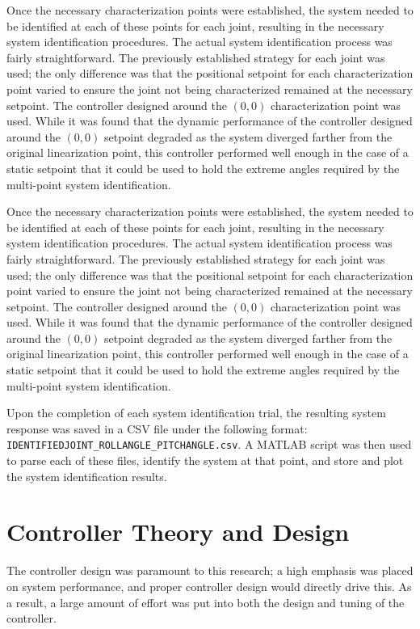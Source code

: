 Once the necessary characterization points were established, the system needed to be identified at each of these points for each joint, resulting in the necessary system identification procedures. The actual system identification process was fairly straightforward. The previously established strategy for each joint was used; the only difference was that the positional setpoint for each characterization point varied to ensure the joint not being characterized remained at the necessary setpoint. The controller designed around the $(0,0)$ characterization point was used. While it was found that the dynamic performance of the controller designed around the $(0,0)$ setpoint degraded as the system diverged farther from the original linearization point, this controller performed well enough in the case of a static setpoint that it could be used to hold the extreme angles required by the multi-point system identification.

Once the necessary characterization points were established, the system needed to be identified at each of these points for each joint, resulting in the necessary system identification procedures. The actual system identification process was fairly straightforward. The previously established strategy for each joint was used; the only difference was that the positional setpoint for each characterization point varied to ensure the joint not being characterized remained at the necessary setpoint. The controller designed around the $(0,0)$ characterization point was used. While it was found that the dynamic performance of the controller designed around the $(0,0)$ setpoint degraded as the system diverged farther from the original linearization point, this controller performed well enough in the case of a static setpoint that it could be used to hold the extreme angles required by the multi-point system identification.

Upon the completion of each system identification trial, the resulting system response was saved in a CSV file under the following format: \texttt{IDENTIFIEDJOINT\_ROLLANGLE\_PITCHANGLE.csv}. A MATLAB script was then used to parse each of these files, identify the system at that point, and store and plot the system identification results.

\section{Controller Theory and Design}
The controller design was paramount to this research; a high emphasis was placed on system performance, and proper controller design would directly drive this. As a result, a large amount of effort was put into both the design and tuning of the controller.

